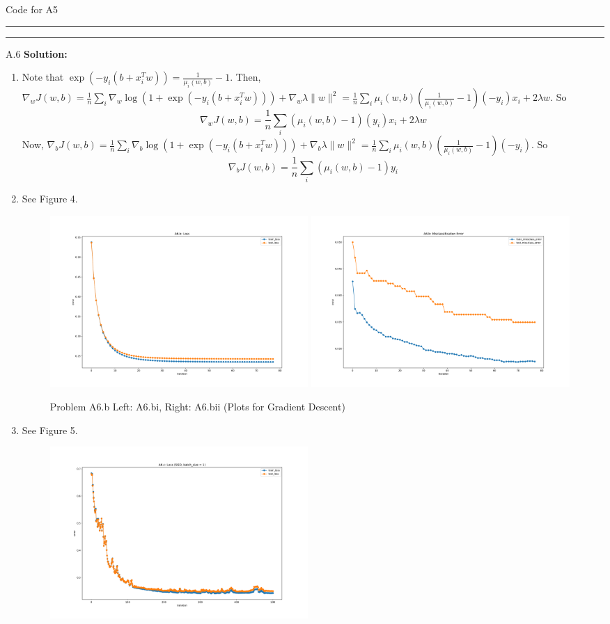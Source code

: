 \documentclass{article}
\newcommand{\1}{\mathbf{1}}
\begin{document}
\inputminted{python}{code/A5.py}
\caption{Code for A5}

\noindent\rule{\textwidth}{1pt}

\noindent\rule{\textwidth}{1pt}
A.6 {\bf Solution:}\\
\begin{enumerate}
    \item Note that $\exp(-y_i(b+x_i^Tw)) = \frac{1}{\mu_i(w,b)} -1$. Then, $\nabla_w J(w,b) = \frac{1}{n}\sum_i \nabla_w \log(1+\exp(-y_i(b+x_i^Tw))) + \nabla_w \lambda \|w\|^2 = \frac{1}{n}\sum_i \mu_i(w, b)(\frac{1}{\mu_i(w,b)} -1)(-y_i)x_i + 2\lambda w$. So
    $$
    \boxed{\nabla_w J(w,b) = \frac{1}{n}\sum_i (\mu_i(w, b) - 1)(y_i)x_i + 2\lambda w}
    $$
    Now, $\nabla_b J(w,b) = \frac{1}{n}\sum_i \nabla_b \log(1+\exp(-y_i(b+x_i^Tw))) + \nabla_b \lambda \|w\|^2 = \frac{1}{n}\sum_i \mu_i(w, b)(\frac{1}{\mu_i(w,b)} -1)(-y_i)$. So
    $$
    \boxed{\nabla_b J(w,b) = \frac{1}{n}\sum_i (\mu_i(w, b) - 1)y_i}
    $$
    \item See Figure 4. 
        \begin{figure}[h!]
            \centering
            \includegraphics[width=0.49\textwidth]{hw2/code/figures/A6b1.pdf}
            \includegraphics[width=0.49\textwidth]{hw2/code/figures/A6b2.pdf}
            \caption{Problem A6.b Left: A6.bi, Right: A6.bii (Plots for Gradient Descent)}
        \end{figure}
    \item See Figure 5. 
        \begin{figure}[h!]
            \centering
            \includegraphics[width=0.49\textwidth]{hw2/code/figures/A6c1.pdf}

\end{figure}
\end{enumerate}
\end{document}
